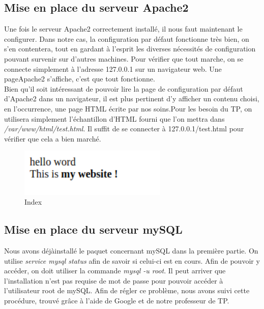\subsection{Mise en place du serveur Apache2}
Une fois le serveur Apache2 correctement installé, il nous faut maintenant le configurer. Dans notre cas, la configuration par défaut fonctionne très bien, on s'en contentera, tout en gardant à l'esprit les diverses nécessités de configuration pouvant survenir sur d'autres machines. Pour vérifier que tout marche, on se connecte simplement à l'adresse 127.0.0.1 sur un navigateur web. Une pageApache2 s'affiche, c'est que tout fonctionne.\\
Bien qu'il soit intéressant de pouvoir lire la page de configuration par défaut d'Apache2 dans un navigateur, il est plus pertinent d'y afficher un contenu choisi, en l'occurrence, une page HTML écrite par nos soins.Pour les besoin du TP, on utilisera simplement l'échantillon d'HTML fourni que l'on mettra dans \textit{/var/www/html/test.html}. Il suffit de se connecter à 127.0.0.1/test.html pour vérifier que cela a bien marché.

\begin{figure}[H]
\centering
\includegraphics[width=200pt]{./TP3/Pictures/index}
\caption{Index}
\label{Index}
\end{figure}

\subsection{Mise en place du serveur mySQL}
Nous avons déjàinstallé le paquet concernant mySQL dans la première partie. On utilise \textit{service mysql status} afin de savoir si celui-ci est en cours. Afin de pouvoir y accéder, on doit utiliser la commande \textit{mysql -u root}. Il peut arriver que l'installation n'est pas requise de mot de passe pour pouvoir accéder à l'utilisateur root de mySQL. Afin de régler ce problème, nous avons suivi cette procédure, trouvé grâce à l'aide de Google et de notre professeur de TP.

